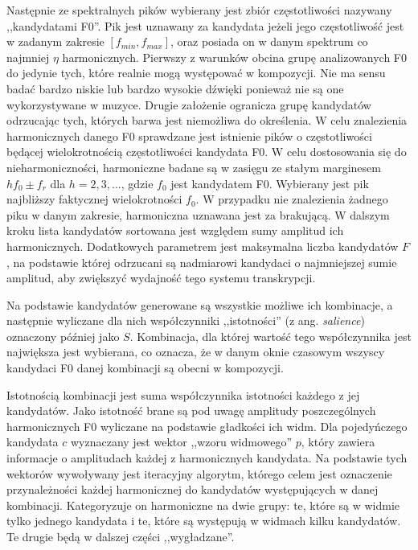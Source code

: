 \documentclass[12pt,a4paper,twoside]{mwart}
\begin{document}
Następnie ze spektralnych pików wybierany jest zbiór częstotliwości nazywany ,,kandydatami F0''. Pik jest uznawany za kandydata jeżeli jego częstotliwość jest w zadanym zakresie $[f_{min}, f_{max}]$, oraz posiada on w danym spektrum co najmniej $\eta$ harmonicznych. Pierwszy z warunków obcina grupę analizowanych F0 do jedynie tych, które realnie mogą występować w kompozycji. Nie ma sensu badać bardzo niskie lub bardzo wysokie dźwięki ponieważ nie są one wykorzystywane w muzyce. Drugie założenie ogranicza grupę kandydatów odrzucając tych, których barwa jest niemożliwa do określenia. W celu znalezienia harmonicznych danego F0 sprawdzane jest istnienie pików o częstotliwości będącej wielokrotnością częstotliwości kandydata F0. W celu dostosowania się do nieharmoniczności, harmoniczne badane są w zasięgu ze stałym marginesem $hf_0 \pm f_r$ dla $h = 2, 3, ...$, gdzie $f_0$ jest kandydatem F0. Wybierany jest pik najbliższy faktycznej wielokrotności $f_0$. W przypadku nie znalezienia żadnego piku w danym zakresie, harmoniczna uznawana jest za brakującą. W dalszym kroku lista kandydatów sortowana jest względem sumy amplitud ich harmonicznych. Dodatkowych parametrem jest maksymalna liczba kandydatów $F$, na podstawie której odrzucani są nadmiarowi kandydaci o najmniejszej sumie amplitud, aby zwiększyć wydajność tego systemu transkrypcji.

Na podstawie kandydatów generowane są wszystkie możliwe ich kombinacje, a następnie wyliczane dla nich współczynniki ,,istotności'' (z ang. \textit{salience}) oznaczony później jako $S$. Kombinacja, dla której wartość tego współczynnika jest największa jest wybierana, co oznacza, że w danym oknie czasowym wszyscy kandydaci F0 danej kombinacji są obecni w kompozycji.

Istotnością kombinacji jest suma współczynnika istotności każdego z jej kandydatów. Jako istotność brane są pod uwagę amplitudy poszczególnych harmonicznych F0 wyliczane na podstawie gładkości ich widm. Dla pojedyńczego kandydata $c$ wyznaczany jest wektor ,,wzoru widmowego'' $p$, który zawiera informacje o amplitudach każdej z harmonicznych kandydata. Na podstawie tych wektorów wywoływany jest iteracyjny algorytm, którego celem jest oznaczenie przynależności każdej harmonicznej do kandydatów występujących w danej kombinacji. Kategoryzuje on harmoniczne na dwie grupy: te, które są w widmie tylko jednego kandydata i te, które są występują w widmach kilku kandydatów. Te drugie będą w dalszej części ,,wygładzane''.
\end{document}
